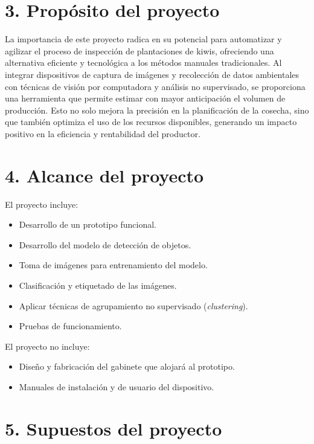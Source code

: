 \documentclass[
11pt, %
]{charter}
\begin{document}
\section{3. Propósito del proyecto}
\label{sec:proposito}

La importancia de este proyecto radica en su potencial para automatizar y agilizar el proceso de inspección de plantaciones de kiwis, ofreciendo una alternativa eficiente y tecnológica a los métodos manuales tradicionales. Al integrar dispositivos de captura de imágenes y recolección de datos ambientales con técnicas de visión por computadora y análisis no supervisado, se proporciona una herramienta  que permite estimar con mayor anticipación el volumen de producción. Esto no solo mejora la precisión en la planificación de la cosecha, sino que también optimiza el uso de los recursos disponibles, generando un impacto positivo en la eficiencia y rentabilidad del productor.

\section{4. Alcance del proyecto}
\label{sec:alcance}

El proyecto incluye:
\begin{itemize}
    \item Desarrollo de un prototipo funcional.
    \item Desarrollo del modelo de detección de objetos.
    \item Toma de imágenes para entrenamiento del modelo.
    \item Clasificación y etiquetado de las imágenes.
    \item Aplicar técnicas de agrupamiento no supervisado (\textit{clustering}).
    \item Pruebas de funcionamiento.
\end{itemize}

El proyecto no incluye:
\begin{itemize}
	
    \item Diseño y fabricación del gabinete que alojará al prototipo.
    \item Manuales de instalación y de usuario del dispositivo.
\end{itemize}


\section{5. Supuestos del proyecto}
\label{sec:supuestos}
\end{document}

